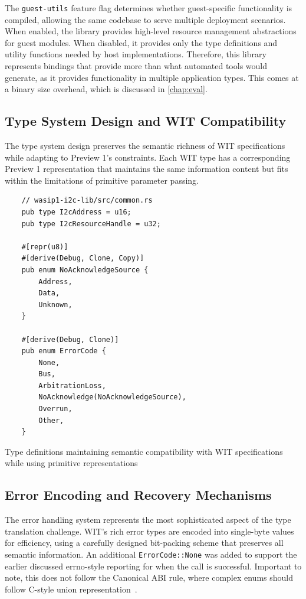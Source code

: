 The \texttt{guest-utils} feature flag determines whether guest-specific functionality is compiled, allowing the same codebase to serve multiple deployment scenarios. When enabled, the library provides high-level resource management abstractions for guest modules. When disabled, it provides only the type definitions and utility functions needed by host implementations. Therefore, this library represents bindings that provide more than what automated tools would generate, as it provides functionality in multiple application types. This comes at a binary size overhead, which is discussed in \autoref{chap:eval}.

\subsection{Type System Design and WIT Compatibility}

The type system design preserves the semantic richness of WIT specifications while adapting to Preview 1's constraints. Each WIT type has a corresponding Preview 1 representation that maintains the same information content but fits within the limitations of primitive parameter passing.

\begin{listing}[H]
    \begin{verbatim}
    // wasip1-i2c-lib/src/common.rs
    pub type I2cAddress = u16;
    pub type I2cResourceHandle = u32;
    
    #[repr(u8)]
    #[derive(Debug, Clone, Copy)]
    pub enum NoAcknowledgeSource {
        Address,
        Data,
        Unknown,
    }
    
    #[derive(Debug, Clone)]
    pub enum ErrorCode {
        None,
        Bus,
        ArbitrationLoss,
        NoAcknowledge(NoAcknowledgeSource),
        Overrun,
        Other,
    }
    \end{verbatim}
    \caption{Type definitions maintaining semantic compatibility with WIT specifications while using primitive representations}
    \label{lst:type-definitions}
\end{listing}

\subsection{Error Encoding and Recovery Mechanisms}

The error handling system represents the most sophisticated aspect of the type translation challenge. WIT's rich error types are encoded into single-byte values for efficiency, using a carefully designed bit-packing scheme that preserves all semantic information. An additional \texttt{ErrorCode::None} was added to support the earlier discussed errno-style reporting for when the call is successful. Important to note, this does not follow the Canonical ABI rule, where complex enums should follow C-style union representation~\cite{c_union}.

